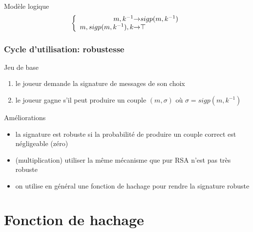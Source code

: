 \begin{reveals}
\begin{frame}
  \vfill

  \begin{block}{Modèle logique}
    \[
      \left\lbrace
        \begin{array}{r@{\ensuremath{\rightarrow}}l}
          m,k^{-1} & sigp(m,k^{-1}) \\
          m,sigp(m,k^{-1}),k & \top\\
        \end{array}
      \right.
    \]
  \end{block}

  \vfill


\end{frame}

\begin{frame}
  \frametitle{Cycle d'utilisation: robustesse}

  \vfill

   \begin{block}{Jeu de base}
     \begin{enumerate}
     \item le joueur demande la signature de messages de son choix
     \item le joueur gagne s'il peut produire un couple \((m,\sigma)\)
       où \(\sigma=sigp(m,k^{-1})\) 
     \end{enumerate}
  \end{block}

  \vfill

  \begin{block}{Améliorations}
    \begin{itemize}
    \item la signature est robuste si la probabilité de produire un
      couple correct est négligeable (zéro)
    \item (multiplication) utiliser la même mécanisme que pur RSA
      n'est pas très robuste
    \item on utilise en général une fonction de hachage pour rendre la
      signature robuste
    \end{itemize}
  \end{block}

  \vfill



\end{frame}


\section{Fonction de hachage}





\end{reveals}
